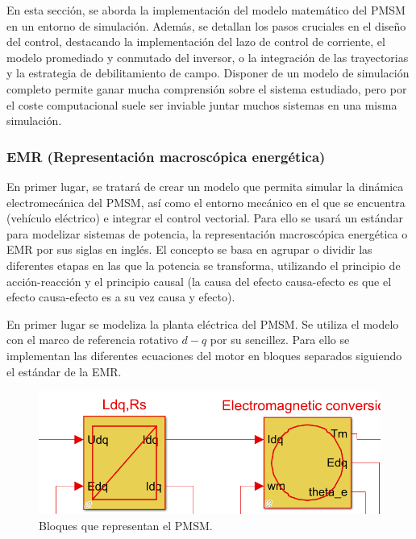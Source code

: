 En esta sección, se aborda la implementación del modelo matemático del PMSM en un entorno de simulación. Además, se detallan los pasos cruciales en el diseño del control, destacando la implementación del lazo de control de corriente, el modelo promediado y conmutado del inversor, o la integración de las trayectorias y la estrategia de debilitamiento de campo. Disponer de un modelo de simulación completo permite ganar mucha comprensión sobre el sistema estudiado, pero por el coste computacional suele ser inviable juntar muchos sistemas en una misma simulación.

\subsubsection{EMR (Representación macroscópica energética)}
En primer lugar, se tratará de crear un modelo que permita simular la dinámica electromecánica del PMSM, así como el entorno mecánico en el que se encuentra (vehículo eléctrico) e integrar el control vectorial. Para ello se usará un estándar para modelizar sistemas de potencia, la representación macroscópica energética o EMR por sus siglas en inglés. El concepto se basa en agrupar o dividir las diferentes etapas en las que la potencia se transforma, utilizando el principio de acción-reacción y el principio causal (la causa del efecto causa-efecto es que el efecto causa-efecto es a su vez causa y efecto). 

En primer lugar se modeliza la planta eléctrica del PMSM. Se utiliza el modelo con el marco de referencia rotativo $d-q$ por su sencillez. Para ello se implementan las diferentes ecuaciones del motor en bloques separados siguiendo el estándar de la EMR.

\begin{figure}[H]
    \centering
    \includegraphics[width=0.7\linewidth]{fig/motorEMR1.png}
    \caption{Bloques que representan el PMSM.}
\end{figure}

